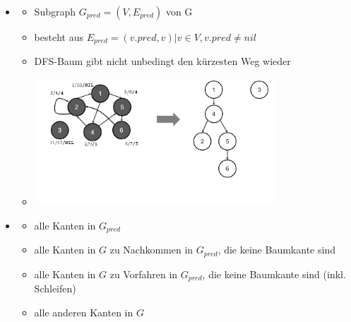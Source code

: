 \documentclass[
    12pt,
    a4paper,
    ngerman,
    color=3b,%
    marginpar=false,
    colorback=false,
    leqno,
]{tudaexercise}
\begin{document}
\begin{itemize}
        \item {}
            \begin{itemize}
                \item Subgraph $G_{pred}=(V,E_{pred})$ von G
                \item besteht aus $E_{pred} = {(v.pred,v)|v \in V, v.pred \neq nil}$
                \item DFS-Baum gibt nicht unbedingt den kürzesten Weg wieder
                \item[] \includegraphics[width=9cm]{pictures/dfswald.PNG}
            \end{itemize}
        \vspace*{-2cm}
        \item {}
            \begin{itemize}
                \item {} alle Kanten in $G_{pred}$
                \item {} alle Kanten in $G$ zu Nachkommen in $G_{pred}$, die keine Baumkante sind
                \item {} alle Kanten in $G$ zu Vorfahren in $G_{pred}$, die keine Baumkante sind (inkl. Schleifen)
                \item {} alle anderen Kanten in $G$
            \end{itemize}


\end{itemize}
\end{document}
